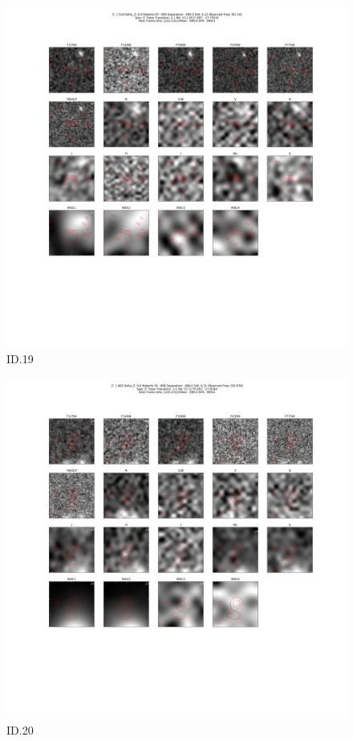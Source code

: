 \begin{figure}[tbp]
\centering \includegraphics[width=120mm]{Matched/ASPECS_Cutout_19.png}
\caption{ID.19}
\label{fig:Match_Three}
\end{figure}

\begin{figure}[tbp]
\centering \includegraphics[width=120mm]{Matched/ASPECS_Cutout_20.png}
\caption{ID.20}
\label{fig:Match_Three}
\end{figure}

